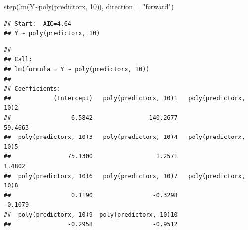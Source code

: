 \documentclass[
]{article}
\newenvironment{Shaded}{\begin{snugshade}}{\end{snugshade}}
\newcommand{\AttributeTok}[1]{\textcolor[rgb]{0.77,0.63,0.00}{#1}}
\newcommand{\DecValTok}[1]{\textcolor[rgb]{0.00,0.00,0.81}{#1}}
\newcommand{\FunctionTok}[1]{\textcolor[rgb]{0.00,0.00,0.00}{#1}}
\newcommand{\NormalTok}[1]{#1}
\newcommand{\SpecialCharTok}[1]{\textcolor[rgb]{0.00,0.00,0.00}{#1}}
\newcommand{\StringTok}[1]{\textcolor[rgb]{0.31,0.60,0.02}{#1}}
\begin{document}
\begin{Shaded}
\begin{Highlighting}[]
\FunctionTok{step}\NormalTok{(}\FunctionTok{lm}\NormalTok{(Y}\SpecialCharTok{\textasciitilde{}}\FunctionTok{poly}\NormalTok{(predictorx, }\DecValTok{10}\NormalTok{)), }\AttributeTok{direction =} \StringTok{"forward"}\NormalTok{)}
\end{Highlighting}
\end{Shaded}

\begin{verbatim}
## Start:  AIC=4.64
## Y ~ poly(predictorx, 10)
\end{verbatim}

\begin{verbatim}
## 
## Call:
## lm(formula = Y ~ poly(predictorx, 10))
## 
## Coefficients:
##            (Intercept)   poly(predictorx, 10)1   poly(predictorx, 10)2  
##                 6.5842                140.2677                 59.4663  
##  poly(predictorx, 10)3   poly(predictorx, 10)4   poly(predictorx, 10)5  
##                75.1300                  1.2571                  1.4802  
##  poly(predictorx, 10)6   poly(predictorx, 10)7   poly(predictorx, 10)8  
##                 0.1190                 -0.3298                 -0.1079  
##  poly(predictorx, 10)9  poly(predictorx, 10)10  
##                -0.2958                 -0.9512
\end{verbatim}
\end{document}
